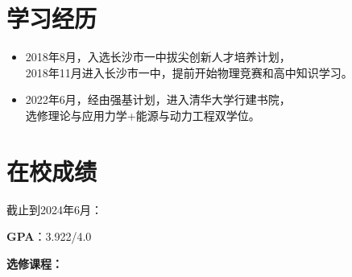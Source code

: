 \documentclass{resume}
\begin{document}




\sepspace
{}


\section{学习经历}
\begin{itemize}
  \item 2018年8月，入选长沙市一中拔尖创新人才培养计划，\\2018年11月进入长沙市一中，提前开始物理竞赛和高中知识学习。
  \item 2022年6月，经由强基计划，进入清华大学行建书院，\\选修理论与应用力学+能源与动力工程双学位。
\end{itemize}

\section{在校成绩}
截止到2024年6月：

\qquad \qquad \textbf{GPA}：3.922/4.0 

\textbf{选修课程：}
  
\end{document}
